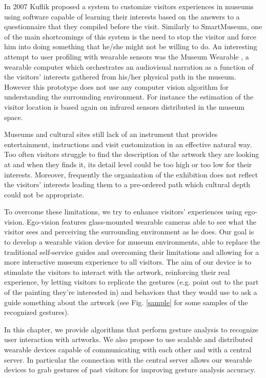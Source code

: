 In 2007 Kuflik \etal \cite{kuflik2011visitor} proposed a system to customize visitors experiences in museums using software capable of learning their interests based on the answers to a questionnaire that they compiled before the visit. Similarly to SmartMuseum, one of the main shortcomings of this system is the need to stop the visitor and force him into doing something that he/she might not be willing to do.
An interesting attempt to user profiling with wearable sensors was the Museum Wearable \cite{sparacino2002museum}, a wearable computer which orchestrates an audiovisual narration as a function of the visitors' interests gathered from his/her physical path in the museum. However this prototype does not use any computer vision algorithm for understanding the surrounding environment. For instance the estimation of the visitor location is based again on infrared sensors distributed in the museum space.

Museums and cultural sites still lack of an instrument that provides entertainment, instructions and visit customization in an effective natural way. Too often visitors struggle to find the description of the artwork they are looking at and when they finds it, its detail level could be too high or too low for their interests. Moreover, frequently the organization of the exhibition does not reflect the visitors' interests leading them to a pre-ordered path which cultural depth could not be appropriate.

To overcome these limitations, we try to enhance visitors' experiences using ego-vision. Ego-vision features glass-mounted wearable cameras able to see what the visitor sees and perceiving the surrounding environment as he does. Our goal is to develop a wearable vision device for museum environments, able to replace the traditional self-service guides and overcoming their limitations and allowing for a more interactive museum experience to all visitors. The aim of our device is to stimulate the visitors to interact with the artwork, reinforcing their real experience, by letting visitors to replicate the gestures (e.g. point out to the part of the painting they're interested in) and behaviors that they would use to ask a guide something about the artwork (see Fig. \ref{sample} for some samples of the recognized gestures).

In this chapter, we provide algorithms that perform gesture analysis to recognize user interaction with artworks. We also propose to use scalable and distributed wearable devices capable of communicating with each other and with a central server. In particular the connection with the central server allows our wearable devices to grab gestures of past visitors for improving gesture analysis accuracy.

